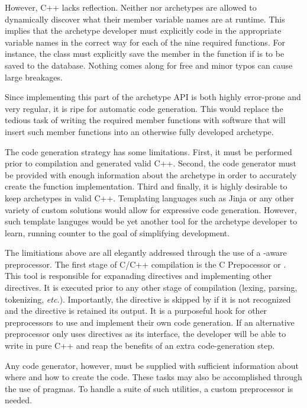 However, C++ lacks reflection. Neither  nor archetypes are allowed
to dynamically discover what their member variable names are at runtime.  This 
implies that the archetype developer must explicitly code in the appropriate variable
names in the correct way for each of the nine required functions.  For instance, 
the  class must explicitly save the  member in the 
 function if  is to be saved to the database.
Nothing comes along for free and minor typos can cause large breakages. 

Since implementing this part of the archetype \gls{API} is both highly error-prone and 
very regular, it is ripe for automatic code generation. This would replace the 
tedious task of writing the required member functions with software that will 
insert such member functions into an otherwise fully developed archetype. 

The code generation strategy has some limitations. First, it must be 
performed prior to compilation and generated valid C++. Second, the
code generator must be provided with enough information about the archetype in 
order to accurately create the function implementation. Third and finally, it 
is highly desirable to keep archetypes in valid C++. Templating languages 
such as Jinja  or any other variety of custom solutions would allow for 
expressive code generation. However, such template languges would be yet another 
tool for the archetype developer to learn, running counter to the goal of 
simplifying development.

The limitiations above are all elegantly addressed through the use of a 
\cyclus-aware preprocessor. The first stage of C/C++ compilation is the 
C Prepocessor or  . This tool is responsible for expanading 
 directives and implementing other \code{#} directives. It is executed
prior to any other stage of compilation (lexing, parsing, tokenizing, \emph{etc.}).
Importantly, the  directive is skipped by  if it is not 
recognized and the directive is retained its output. It is a
purposeful hook for other preprocessors to use and implement their own code generation.
If an alternative preprocessor only uses  directives as its interface, 
the developer will be able to write in pure C++ and reap the benefits
of an extra code-generation step. 

Any code generator, however, must be supplied with sufficient information about
where and how to create the code. These tasks may also be accomplished through 
the use of pragmas. To handle a suite of such utilities, a custom preprocessor
is needed.

